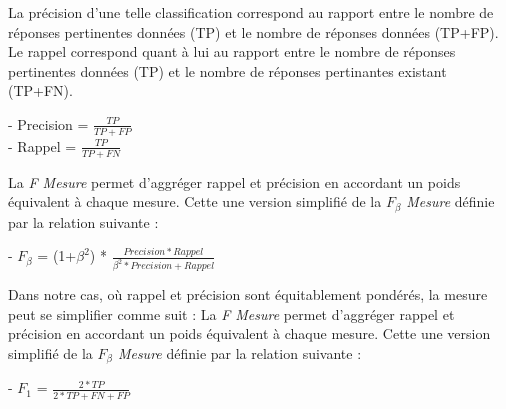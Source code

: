 \documentclass[a4paper,10pt]{report}
\begin{document}
La précision d'une telle classification correspond au rapport entre le nombre de réponses pertinentes données (TP) et le nombre de réponses données (TP+FP). Le rappel correspond quant à lui au rapport entre le nombre de réponses pertinentes données (TP) et le nombre de réponses pertinantes existant (TP+FN). 

\begin{center}
- Precision = $\frac{TP}{TP+FP}$ \\
\vspace{0.15cm}
- Rappel = $\frac{TP}{TP+FN}$\\
\end{center}

La \emph{F Mesure} permet d'aggréger rappel et précision en accordant un poids équivalent à chaque mesure. Cette une version simplifié de la \emph{$F_{\beta}$ Mesure} définie par la relation suivante : 
\begin{center}
- \emph{$F_{\beta}$} = (1+$\beta^{2}$) * $\frac{Precision*Rappel}{\beta^{2}*Precision + Rappel}$
\end{center}

Dans notre cas, où rappel et précision sont équitablement pondérés, la mesure peut se simplifier comme suit :
La \emph{F Mesure} permet d'aggréger rappel et précision en accordant un poids équivalent à chaque mesure. Cette une version simplifié de la \emph{$F_{\beta}$ Mesure} définie par la relation suivante : 
\begin{center}
- \emph{$F_{1}$} = $\frac{2*TP}{2*TP + FN + FP }$
\end{center}
\end{document}
